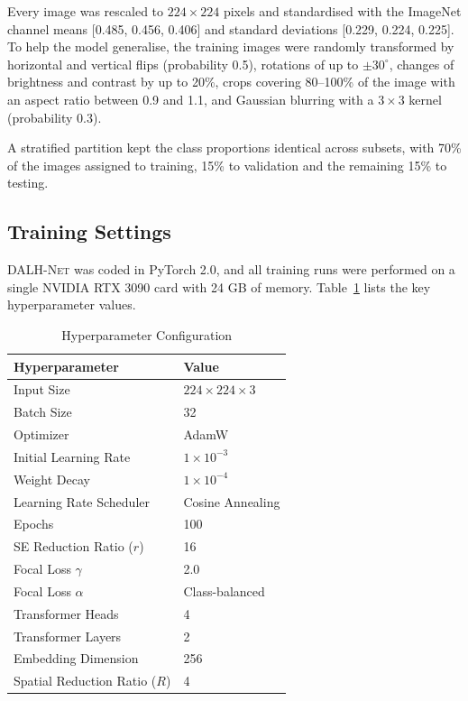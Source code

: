 \documentclass[default, iicol]{sn-jnl}
\theoremstyle{thmstyleone}%
\theoremstyle{thmstyletwo}%
\theoremstyle{thmstylethree}%
\newcommand{\dalh}{\textsc{DALH-Net}}
\begin{document}
Every image was rescaled to $224 \times 224$ pixels and standardised with the ImageNet channel means [0.485, 0.456, 0.406] and standard deviations [0.229, 0.224, 0.225]. To help the model generalise, the training images were randomly transformed by horizontal and vertical flips (probability 0.5), rotations of up to $\pm 30^\circ$, changes of brightness and contrast by up to 20\%, crops covering 80--100\% of the image with an aspect ratio between 0.9 and 1.1, and Gaussian blurring with a $3 \times 3$ kernel (probability 0.3).

A stratified partition kept the class proportions identical across subsets, with 70\% of the images assigned to training, 15\% to validation and the remaining 15\% to testing.

\subsection{Training Settings}

\dalh{} was coded in PyTorch 2.0, and all training runs were performed on a single NVIDIA RTX 3090 card with 24 GB of memory. Table~\ref{tab:hyperparams} lists the key hyperparameter values.

\begin{table}[htbp]
\centering
\caption{Hyperparameter Configuration}
\label{tab:hyperparams}
\begin{tabular}{|l|l|}
\toprule
\textbf{Hyperparameter} & \textbf{Value} \\
\midrule
Input Size & $224 \times 224 \times 3$ \\
Batch Size & 32 \\
Optimizer & AdamW \\
Initial Learning Rate & $1 \times 10^{-3}$ \\
Weight Decay & $1 \times 10^{-4}$ \\
Learning Rate Scheduler & Cosine Annealing \\
Epochs & 100 \\
SE Reduction Ratio ($r$) & 16 \\
Focal Loss $\gamma$ & 2.0 \\
Focal Loss $\alpha$ & Class-balanced \\
Transformer Heads & 4 \\
Transformer Layers & 2 \\
Embedding Dimension & 256 \\
Spatial Reduction Ratio ($R$) & 4 \\
\bottomrule
\end{tabular}
\end{table}
\end{document}
